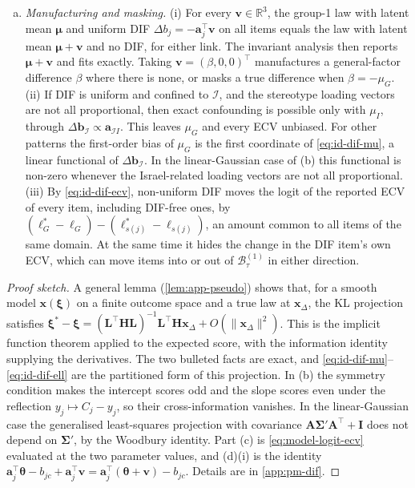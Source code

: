 \begin{theorem}
\begin{enumerate}[(a)]
  \begin{equation}\label{eq:id-dif-ecv}
    \logit\widehat{\mathrm{ECV}}{}^{(1)}_j-\logit\mathrm{ECV}^{(1)}_j
    =(\ell^*_G-\ell_G)-(\ell^*_{s(j)}-\ell_{s(j)})
     -2\log\Bigl|1+\frac{\Delta a_{jG}}{a_{jG}}\Bigr|+2\log\Bigl|1+\frac{\Delta a_{js}}{a_{js}}\Bigr|,
  \end{equation}
  with $\bm\ell^*-\bm\ell$ given by \eqref{eq:id-dif-ell}.
  \item \emph{Manufacturing and masking.} (i) For every $\bm v\in\mathbb R^3$, the group-1 law with latent mean $\bm\mu$ and uniform DIF $\Delta b_j=-\bm a_j^\top\bm v$ on all items equals the law with latent mean $\bm\mu+\bm v$ and no DIF, for either link. The invariant analysis then reports $\bm\mu+\bm v$ and fits exactly. Taking $\bm v=(\beta,0,0)^\top$ manufactures a general-factor difference $\beta$ where there is none, or masks a true difference when $\beta=-\mu_G$. (ii) If DIF is uniform and confined to $\mathcal I$, and the stereotype loading vectors are not all proportional, then exact confounding is possible only with $\mu_I$, through $\Delta\bm b_{\mathcal I}\propto\bm a_{\mathcal II}$. This leaves $\mu_G$ and every ECV unbiased. For other patterns the first-order bias of $\mu_G$ is the first coordinate of \eqref{eq:id-dif-mu}, a linear functional of $\Delta\bm b_{\mathcal I}$. In the linear-Gaussian case of (b) this functional is non-zero whenever the Israel-related loading vectors are not all proportional. (iii) By \eqref{eq:id-dif-ecv}, non-uniform DIF moves the logit of the reported ECV of every item, including DIF-free ones, by $(\ell^*_G-\ell_G)-(\ell^*_{s(j)}-\ell_{s(j)})$, an amount common to all items of the same domain. At the same time it hides the change in the DIF item's own ECV, which can move items into or out of $\mathcal B^{(1)}_\tau$ in either direction.
\end{enumerate}
\end{theorem}

\begin{proof}[Proof sketch]
A general lemma (\cref{lem:app-pseudo}) shows that, for a smooth model $\bm x(\bm\xi)$ on a finite outcome space and a true law at $\bm x_\Delta$, the KL projection satisfies $\bm\xi^*-\bm\xi=(\bm L^\top\bm H\bm L)^{-1}\bm L^\top\bm H\bm x_\Delta+O(\|\bm x_\Delta\|^2)$. This is the implicit function theorem applied to the expected score, with the information identity supplying the derivatives. The two bulleted facts are exact, and \eqref{eq:id-dif-mu}--\eqref{eq:id-dif-ell} are the partitioned form of this projection. In (b) the symmetry condition makes the intercept scores odd and the slope scores even under the reflection $y_j\mapsto C_j-y_j$, so their cross-information vanishes. In the linear-Gaussian case the generalised least-squares projection with covariance $\bm A\bm\Sigma'\bm A^\top+\bm I$ does not depend on $\bm\Sigma'$, by the Woodbury identity. Part (c) is \eqref{eq:model-logit-ecv} evaluated at the two parameter values, and (d)(i) is the identity $\bm a_j^\top\bm\theta-b_{jc}+\bm a_j^\top\bm v=\bm a_j^\top(\bm\theta+\bm v)-b_{jc}$. Details are in \cref{app:pm-dif}.
\end{proof}

